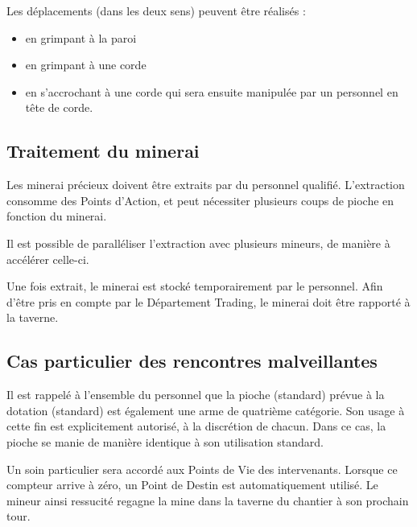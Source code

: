 Les déplacements (dans les deux sens) peuvent être réalisés :
\begin{itemize}
        \item en grimpant à la paroi
        \item en grimpant à une corde
        \item en s'accrochant à une corde qui sera ensuite manipulée par un personnel en tête de corde.
\end{itemize}

\subsection{Traitement du minerai}
Les minerai précieux doivent être extraits par du personnel qualifié. L'extraction consomme des Points d'Action, et peut nécessiter plusieurs coups de pioche en fonction du minerai.

Il est possible de paralléliser l'extraction avec plusieurs mineurs, de manière à accélérer celle-ci.

Une fois extrait, le minerai est stocké temporairement par le personnel. Afin d'être pris en compte par le Département Trading, le minerai doit être rapporté à la taverne.

\subsection{Cas particulier des rencontres malveillantes}
Il est rappelé à l'ensemble du personnel que la pioche (standard) prévue à la dotation (standard) est également une arme de quatrième catégorie. Son usage à cette fin est explicitement autorisé, à la discrétion de chacun. Dans ce cas, la pioche se manie de manière identique à son utilisation standard.

Un soin particulier sera accordé aux Points de Vie des intervenants. Lorsque ce compteur arrive à zéro, un Point de Destin est automatiquement utilisé. Le mineur ainsi ressucité regagne la mine dans la taverne du chantier à son prochain tour.


